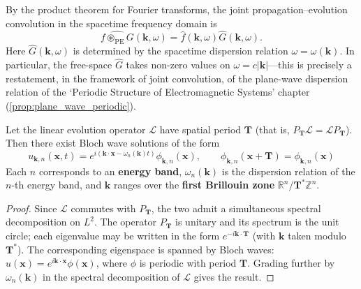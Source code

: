 \begin{remark}\label{rem:joint_convolution_fourier}
By the product theorem for Fourier transforms, the joint propagation--evolution convolution in the spacetime frequency domain is
\[
\widehat{f\circledast_{\text{PE}}G}(\mathbf{k},\omega) = \hat f(\mathbf{k},\omega)\hat G(\mathbf{k},\omega).
\]
Here $\hat G(\mathbf{k},\omega)$ is determined by the spacetime dispersion relation $\omega = \omega(\mathbf{k})$. In particular, the free-space $\hat G$ takes non-zero values on $\omega = c|\mathbf{k}|$---this is precisely a restatement, in the framework of joint convolution, of the plane-wave dispersion relation of the `Periodic Structure of Electromagnetic Systems' chapter (\cref{prop:plane_wave_periodic}).
\end{remark}

\begin{theorem}\label{thm:bloch_floquet}
Let the linear evolution operator $\mathcal{L}$ have spatial period $\mathbf{T}$ (that is, $P_{\mathbf{T}}\mathcal{L} = \mathcal{L}P_{\mathbf{T}}$). Then there exist Bloch wave solutions of the form
\[
u_{\mathbf{k},n}(\mathbf{x},t) = e^{i(\mathbf{k}\cdot\mathbf{x}-\omega_n(\mathbf{k})t)}\phi_{\mathbf{k},n}(\mathbf{x}), \qquad \phi_{\mathbf{k},n}(\mathbf{x}+\mathbf{T}) = \phi_{\mathbf{k},n}(\mathbf{x})
\]
Each $n$ corresponds to an \textbf{energy band}, $\omega_n(\mathbf{k})$ is the dispersion relation of the $n$-th energy band, and $\mathbf{k}$ ranges over the \textbf{first Brillouin zone} $\mathbb{R}^n/\mathbf{T}^*\mathbb{Z}^n$.
\end{theorem}

\begin{proof}
Since $\mathcal{L}$ commutes with $P_{\mathbf{T}}$, the two admit a simultaneous spectral decomposition on $L^2$. The operator $P_{\mathbf{T}}$ is unitary and its spectrum is the unit circle; each eigenvalue may be written in the form $e^{-i\mathbf{k}\cdot\mathbf{T}}$ (with $\mathbf{k}$ taken modulo $\mathbf{T}^*$). The corresponding eigenspace is spanned by Bloch waves: $u(\mathbf{x}) = e^{i\mathbf{k}\cdot\mathbf{x}}\phi(\mathbf{x})$, where $\phi$ is periodic with period $\mathbf{T}$. Grading further by $\omega_n(\mathbf{k})$ in the spectral decomposition of $\mathcal{L}$ gives the result.
\end{proof}


